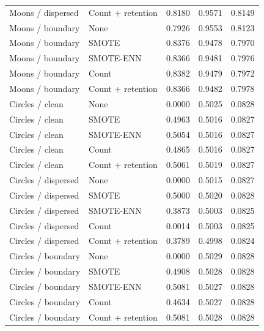 \begin{table}[htbp]
\begin{tabular}{llrrr}
Moons / dispersed & Count + retention & 0.8180 & 0.9571 & 0.8149 \\
Moons / boundary & None & 0.7926 & 0.9553 & 0.8123 \\
Moons / boundary & SMOTE & 0.8376 & 0.9478 & 0.7970 \\
Moons / boundary & SMOTE-ENN & 0.8366 & 0.9481 & 0.7976 \\
Moons / boundary & Count & 0.8382 & 0.9479 & 0.7972 \\
Moons / boundary & Count + retention & 0.8366 & 0.9482 & 0.7978 \\
Circles / clean & None & 0.0000 & 0.5025 & 0.0828 \\
Circles / clean & SMOTE & 0.4963 & 0.5016 & 0.0827 \\
Circles / clean & SMOTE-ENN & 0.5054 & 0.5016 & 0.0827 \\
Circles / clean & Count & 0.4865 & 0.5016 & 0.0827 \\
Circles / clean & Count + retention & 0.5061 & 0.5019 & 0.0827 \\
Circles / dispersed & None & 0.0000 & 0.5015 & 0.0827 \\
Circles / dispersed & SMOTE & 0.5000 & 0.5020 & 0.0828 \\
Circles / dispersed & SMOTE-ENN & 0.3873 & 0.5003 & 0.0825 \\
Circles / dispersed & Count & 0.0014 & 0.5003 & 0.0825 \\
Circles / dispersed & Count + retention & 0.3789 & 0.4998 & 0.0824 \\
Circles / boundary & None & 0.0000 & 0.5029 & 0.0828 \\
Circles / boundary & SMOTE & 0.4908 & 0.5028 & 0.0828 \\
Circles / boundary & SMOTE-ENN & 0.5081 & 0.5027 & 0.0828 \\
Circles / boundary & Count & 0.4634 & 0.5027 & 0.0828 \\
Circles / boundary & Count + retention & 0.5081 & 0.5028 & 0.0828 \\
\hline
\end{tabular}
\end{table}
\clearpage
